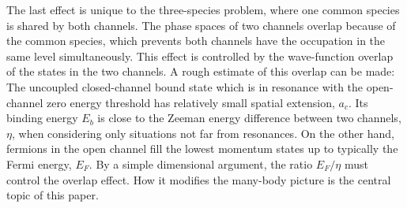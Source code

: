 \documentclass[reprint,pra]{revtex4-1}
\providecommand{\abs}[1]{\ensuremath{\left\lvert{#1}\right\rvert}}
\begin{document}
The last effect is unique to the three-species problem, where one common species is shared by both channels.  The phase spaces of two channels overlap because of  the common species, which prevents both channels have the occupation in the same  level simultaneously. This effect is controlled by the wave-function overlap of the states in the two channels. A rough estimate of this overlap can be made: The uncoupled closed-channel bound state which is in resonance with the open-channel zero energy threshold has  relatively small  spatial extension, $a_c$.  Its binding energy $E_b$ is close to the Zeeman energy difference between two channels, $\eta$, when considering only situations not far from resonances.  On the other hand, fermions in the open channel fill the lowest  momentum states up to typically the Fermi energy, $E_F$.  By a simple dimensional argument, the ratio $E_F/\eta$ must control the overlap effect.   How it modifies the many-body picture is the central topic of this paper. 

\end{document}
